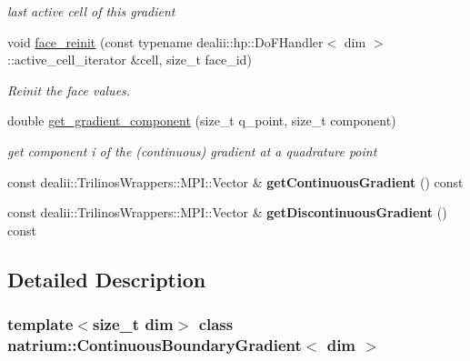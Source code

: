 \begin{DoxyCompactItemize}
\begin{DoxyCompactList}\small\item\em last active cell of this gradient \item\end{DoxyCompactList}\item 
void \hyperlink{classnatrium_1_1ContinuousBoundaryGradient_a2345918a9418d4f53d2f52de71c17237}{face\_\-reinit} (const typename dealii::hp::DoFHandler$<$ dim $>$::active\_\-cell\_\-iterator \&cell, size\_\-t face\_\-id)
\begin{DoxyCompactList}\small\item\em Reinit the face values. \item\end{DoxyCompactList}\item 
\hypertarget{classnatrium_1_1ContinuousBoundaryGradient_ae1ef18bcd802bcbfc84419f42bb699da}{
double \hyperlink{classnatrium_1_1ContinuousBoundaryGradient_ae1ef18bcd802bcbfc84419f42bb699da}{get\_\-gradient\_\-component} (size\_\-t q\_\-point, size\_\-t component)}
\label{classnatrium_1_1ContinuousBoundaryGradient_ae1ef18bcd802bcbfc84419f42bb699da}

\begin{DoxyCompactList}\small\item\em get component i of the (continuous) gradient at a quadrature point \item\end{DoxyCompactList}\item 
\hypertarget{classnatrium_1_1ContinuousBoundaryGradient_a73672ffc86ec74c4e48e2e46f84d99b2}{
const dealii::TrilinosWrappers::MPI::Vector \& {\bfseries getContinuousGradient} () const }
\label{classnatrium_1_1ContinuousBoundaryGradient_a73672ffc86ec74c4e48e2e46f84d99b2}

\item 
\hypertarget{classnatrium_1_1ContinuousBoundaryGradient_af075434e3eea2d7e6281e867aefc28b0}{
const dealii::TrilinosWrappers::MPI::Vector \& {\bfseries getDiscontinuousGradient} () const }
\label{classnatrium_1_1ContinuousBoundaryGradient_af075434e3eea2d7e6281e867aefc28b0}

\end{DoxyCompactItemize}


\subsection{Detailed Description}
\subsubsection*{template$<$size\_\-t dim$>$ class natrium::ContinuousBoundaryGradient$<$ dim $>$}

